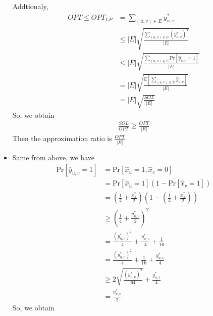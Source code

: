 \documentclass[12pt]{article}
\newenvironment{solution}[2][Solution]{\begin{trivlist}
\item[\hskip \labelsep {\bfseries #1}\hskip \labelsep {\bfseries #2.}]}{\end{trivlist}}
\begin{document}
\begin{solution}{2}
\begin{itemize}
              Addtionaly,
              \begin{align*}
                  OPT \le OPT_{LP} & = \sum_{(u,v) \in E}y_{u, v}^*                                           \\
                                   & \le |E|\sqrt{\frac{\sum_{(u,v) \in E}(y_{u, v}^*)^2}{|E|}}               \\
                                   & \le |E|\sqrt{\frac{\sum_{(u,v) \in E}\mathrm{Pr}[\hat{y}_{u,v}=1]}{|E|}} \\
                                   & = |E|\sqrt{\frac{\mathbb{E}[\sum_{(u,v) \in E}\hat{y}_{u,v}]}{|E|}}      \\
                                   & = |E|\sqrt{\frac{SOL}{|E|}}
              \end{align*}
              So, we obtain
              \begin{align*}
                  \frac{SOL}{OPT} \ge \frac{OPT}{|E|}
              \end{align*}
              Then the approximation ratio is $\frac{OPT}{|E|}$
        \item Same from above, we have
              \begin{align*}
                  \mathrm{Pr}[\hat{y}_{u,v}=1] & =\mathrm{Pr}[\hat{x}_u = 1, \hat{x}_v = 0]                       \\
                                               & =\mathrm{Pr}[\hat{x}_u = 1](1-\mathrm{Pr}[\hat{x}_v = 1])        \\
                                               & = (\frac{1}{4}+\frac{x_u^*}{2})(1-(\frac{1}{4}+\frac{x_u^*}{2})) \\
                                               & \ge (\frac{1}{4}+\frac{y_{u,v}^*}{2})^2                          \\
                                               & = \frac{(y_{u,v}^*)^2}{4} + \frac{y_{u,v}^*}{4} + \frac{1}{16}   \\
                                               & = \frac{(y_{u,v}^*)^2}{4} + \frac{1}{16} + \frac{y_{u,v}^*}{4}   \\
                                               & \ge 2\sqrt{\frac{(y_{u,v}^*)^2}{64}} + \frac{y_{u,v}^*}{4}       \\
                                               & = \frac{y_{u,v}^*}{2}
              \end{align*}
              So, we obtain
              \begin{align*}

\end{align*}
\end{itemize}
\end{solution}
\end{document}
